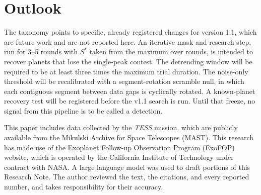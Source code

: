 \documentclass[RNAAS]{aastex631}
\begin{document}
\section{Outlook}

The taxonomy points to specific, already registered changes for version 1.1, which are future work and are not reported here. An iterative mask-and-research step, run for 3--5 rounds with $S^{*}$ taken from the maximum over rounds, is intended to recover planets that lose the single-peak contest. The detrending window will be required to be at least three times the maximum trial duration. The noise-only threshold will be recalibrated with a segment-rotation scramble null, in which each contiguous segment between data gaps is cyclically rotated. A known-planet recovery test will be registered before the v1.1 search is run. Until that freeze, no signal from this pipeline is to be called a detection.

\acknowledgments

This paper includes data collected by the \textit{TESS} mission, which are publicly available from the Mikulski Archive for Space Telescopes (MAST). This research has made use of the Exoplanet Follow-up Observation Program (ExoFOP) website, which is operated by the California Institute of Technology under contract with NASA. A large language model was used to draft portions of this Research Note. The author reviewed the text, the citations, and every reported number, and takes responsibility for their accuracy.



\end{document}
